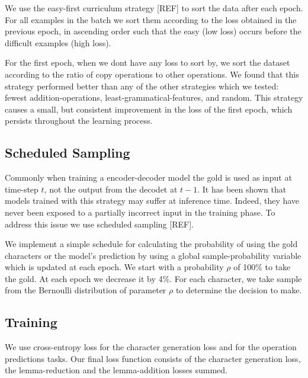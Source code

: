 \documentclass[11pt,a4paper]{article}
\begin{document}
We use the easy-first curriculum strategy [REF] to sort the data after
each epoch. For all examples in the batch we sort them according to
the loss obtained in the previous epoch, in ascending order such that
the easy (low loss) occurs before the difficult examples (high loss).

For the first epoch, when we dont have any loss to sort by, we sort
the dataset according to the ratio of copy operations to other
operations. We found that this strategy performed better than any of
the other strategies which we tested: fewest addition-operations,
least-grammatical-features, and random.
This strategy causes a small, but consistent improvement in the loss
of the first epoch, which persists throughout the learning process.

\subsection{Scheduled Sampling}

Commonly when training a encoder-decoder model the gold is used as input at
time-step $t$, not the output from the decodet at $t-1$.
It has been shown that models trained with this strategy may suffer
at inference time. Indeed, they have never been exposed to a partially
incorrect input in the training phase.  To address this issue we use
scheduled sampling [REF].

We implement a simple schedule for calculating the probability of
using the gold characters or the model's prediction by using a global
sample-probability variable which is updated at each epoch. We start
with a probability \(\rho\) of 100\% to take the gold. At each epoch
we decrease it by 4\%. For each character, we take sample from the
Bernoulli distribution of parameter \(\rho\) to determine the
decision to make.

\subsection{Training}

We use cross-entropy loss for the character generation loss and 
for the operation predictions tasks. Our final loss function consists
of the character generation loss, the lemma-reduction and the
lemma-addition losses summed.
\end{document}
